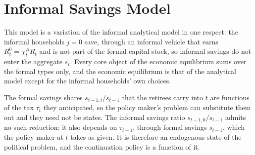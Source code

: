 \edef\refsec{\refmodelsec}
\edef\refeq{\refmodeleq}

\section{Informal Savings Model}\label{\refsec}
This model is a variation of the informal analytical model in one respect: the informal households $j=0$ save, through an informal vehicle that earns $R_t^0 = \chi_t^RR_t$ and is not part of the formal capital stock, so informal savings do not enter the aggregate $s_t$. Every core object of the economic equilibrium sums over the formal types only, and the economic equilibrium is that of the analytical model except for the informal households' own choices.

The formal savings shares $s_{t-1,i}/s_{t-1}$ that the retirees carry into $t$ are functions of the tax $\tau_t$ they anticipated, so the policy maker's problem can substitute them out and they need not be states. The informal savings ratio $s_{t-1,0}/s_{t-1}$ admits no such reduction: it also depends on $\tau_{t-1}$, through formal savings $s_{t-1}$, which the policy maker at $t$ takes as given. It is therefore an endogenous state of the political problem, and the continuation policy is a function of it.








